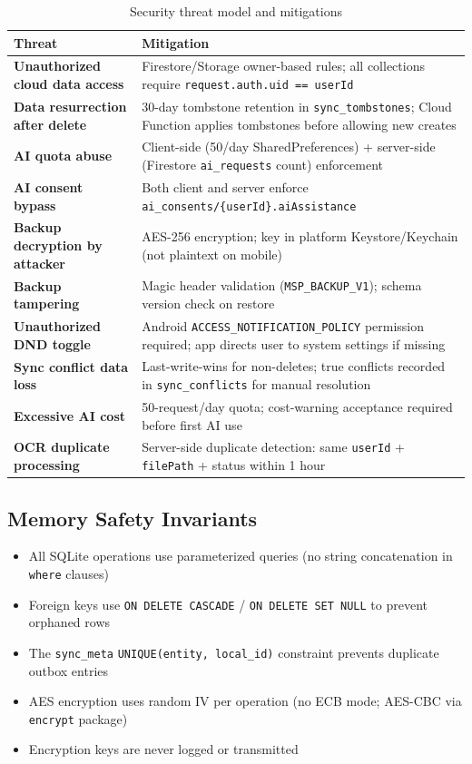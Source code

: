 \documentclass[12pt,a4paper,openany]{report}
\begin{document}
\begin{table}[H]
\centering
\caption{Security threat model and mitigations}
\label{tab:threat-model}
\small
\begin{tabular}{>{\bfseries}l p{8cm}}
\toprule
\textbf{Threat} & \textbf{Mitigation} \\
\midrule
Unauthorized cloud data access & Firestore/Storage owner-based rules; all collections require \texttt{request.auth.uid == userId} \\
Data resurrection after delete & 30-day tombstone retention in \texttt{sync\_tombstones}; Cloud Function applies tombstones before allowing new creates \\
AI quota abuse & Client-side (50/day SharedPreferences) + server-side (Firestore \texttt{ai\_requests} count) enforcement \\
AI consent bypass & Both client and server enforce \texttt{ai\_consents/\{userId\}.aiAssistance} \\
Backup decryption by attacker & AES-256 encryption; key in platform Keystore/Keychain (not plaintext on mobile) \\
Backup tampering & Magic header validation (\texttt{MSP\_BACKUP\_V1}); schema version check on restore \\
Unauthorized DND toggle & Android \texttt{ACCESS\_NOTIFICATION\_POLICY} permission required; app directs user to system settings if missing \\
Sync conflict data loss & Last-write-wins for non-deletes; true conflicts recorded in \texttt{sync\_conflicts} for manual resolution \\
Excessive AI cost & 50-request/day quota; cost-warning acceptance required before first AI use \\
OCR duplicate processing & Server-side duplicate detection: same \texttt{userId} + \texttt{filePath} + status within 1 hour \\
\bottomrule
\end{tabular}
\end{table}

\subsection{Memory Safety Invariants}

\begin{itemize}[leftmargin=*]
  \item All SQLite operations use parameterized queries (no string concatenation in \texttt{where} clauses)
  \item Foreign keys use \texttt{ON DELETE CASCADE} / \texttt{ON DELETE SET NULL} to prevent orphaned rows
  \item The \texttt{sync\_meta} \texttt{UNIQUE(entity, local\_id)} constraint prevents duplicate outbox entries
  \item AES encryption uses random IV per operation (no ECB mode; AES-CBC via \texttt{encrypt} package)
  \item Encryption keys are never logged or transmitted
\end{itemize}
\end{document}
